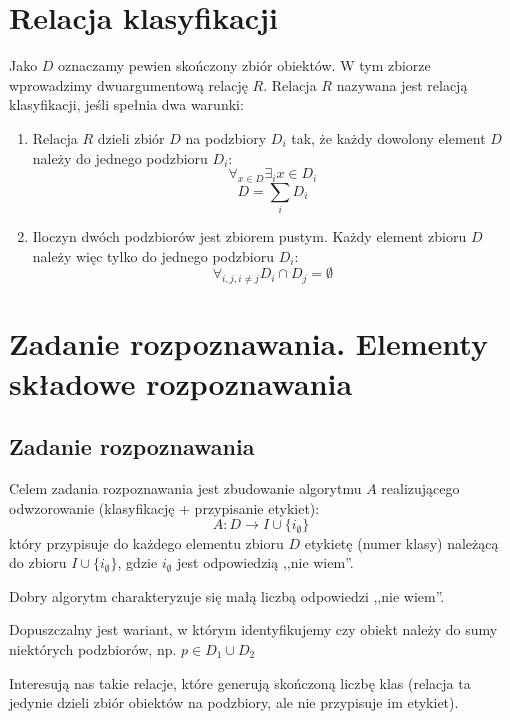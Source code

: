 \documentclass[a4paper,10pt]{article}
\begin{document}
\tableofcontents

\section{Relacja klasyfikacji}
Jako $D$ oznaczamy pewien skończony zbiór obiektów. W tym zbiorze wprowadzimy dwuargumentową relację $R$. Relacja $R$ nazywana jest relacją klasyfikacji, jeśli spełnia dwa warunki:
\begin{enumerate}
 \item Relacja $R$ dzieli zbiór $D$ na podzbiory $D_i$ tak, że każdy dowolony element $D$ należy do jednego podzbioru $D_i$:
\begin {equation}
 \displaystyle\mathop{\forall}_{x \in D} \mathop{\exists}_i x \in D_i
\end {equation}
\begin{equation}
 D = \sum_i D_i
\end{equation}
 \item Iloczyn dwóch podzbiorów jest zbiorem pustym. Każdy element zbioru $D$ należy więc tylko do jednego podzbioru $D_i$:
\begin{equation}
 \mathop{\forall}_{i, j, i \neq j} D_i \cap D_j = \emptyset
\end{equation}
\end{enumerate}

\section{Zadanie rozpoznawania. Elementy składowe rozpoznawania}
\subsection{Zadanie rozpoznawania}
Celem zadania rozpoznawania jest zbudowanie algorytmu $A$ realizującego odwzorowanie (klasyfikację + przypisanie etykiet):
\begin{equation}
 A : D \rightarrow I \cup \{i_{\emptyset}\}
\end{equation}
który przypisuje do każdego elementu zbioru $D$ etykietę (numer klasy) należącą do zbioru $I \cup \{i_{\emptyset}\}$, gdzie $i_{\emptyset}$ jest odpowiedzią ,,nie wiem''.

Dobry algorytm charakteryzuje się małą liczbą odpowiedzi ,,nie wiem''.

Dopuszczalny jest wariant, w którym identyfikujemy czy obiekt należy do sumy niektórych podzbiorów, np. $p \in D_1 \cup D_2$

Interesują nas takie relacje, które generują skończoną liczbę klas (relacja ta jedynie dzieli zbiór obiektów na podzbiory, ale nie przypisuje im etykiet).
\end{document}
